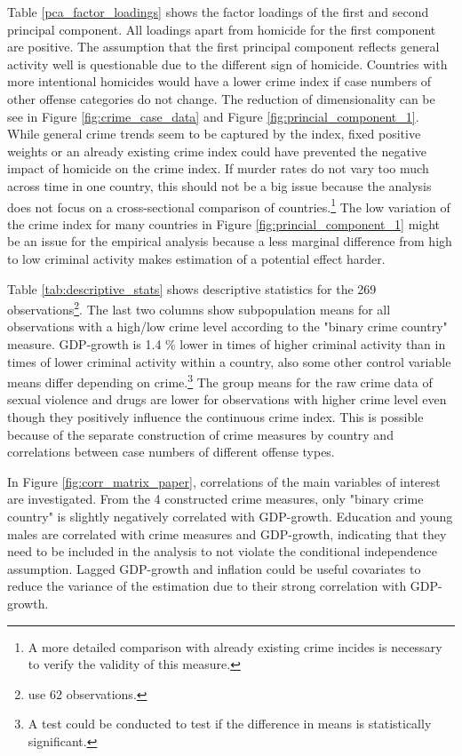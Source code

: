 \documentclass[a4paper,12pt]{article}
\begin{document}
Table \ref{pca_factor_loadings} shows the factor loadings of the first and second principal component. All loadings apart from homicide for the first component are positive. The assumption that the first principal component reflects general activity well is questionable due to the different sign of homicide. Countries with more intentional homicides would have a lower crime index if case numbers of other offense categories do not change. The reduction of dimensionality can be see in Figure \ref{fig:crime_case_data} and Figure \ref{fig:princial_component_1}. While general crime trends seem to be captured by the index, fixed positive weights or an already existing crime index could have prevented the negative impact of homicide on the crime index. If murder rates do not vary too much across time in one country, this should not be a big issue because the analysis does not focus on a cross-sectional comparison of countries.\footnote{A more detailed comparison with already existing crime incides is necessary to verify the validity of this measure.}
The low variation of the crime index for many countries in Figure \ref{fig:princial_component_1} might be an issue for the empirical analysis because a less marginal difference from high to low criminal activity makes estimation of a potential effect harder. 

Table \ref{tab:descriptive_stats} shows descriptive statistics for the 269 observations\footnote{\cite{entorf} use 62 observations.}. The last two columns show subpopulation means for all observations with a high/low crime level according to the "binary crime country" measure. GDP-growth is 1.4 \% lower in times of higher criminal activity than in times of lower criminal activity within a country, also some other control variable means differ depending on crime.\footnote{A test could be conducted to test if the difference in means is statistically significant.} The group means for the raw crime data of sexual violence and drugs are lower for observations with higher crime level even though they positively influence the continuous crime index. This is possible because of the separate construction of crime measures by country and correlations between case numbers of different offense types.


In Figure \ref{fig:corr_matrix_paper}, correlations of the main variables of interest are investigated. From the 4 constructed crime measures, only "binary crime country" is slightly negatively correlated with GDP-growth. Education and young males are correlated with crime measures and GDP-growth, indicating that they need to be included in the analysis to not violate the conditional independence assumption. Lagged GDP-growth and inflation could be useful covariates to reduce the variance of the estimation due to their strong correlation with GDP-growth. 
\end{document}
